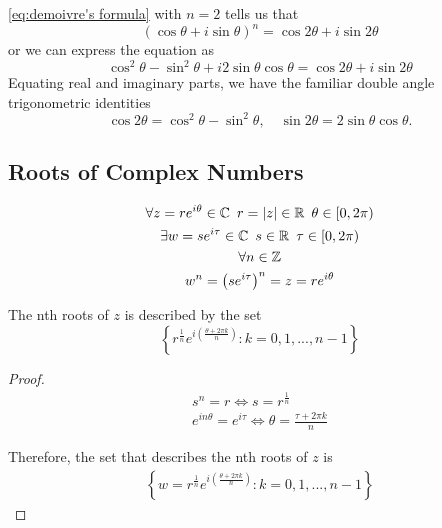 \documentclass[11pt, oneside]{book}
\begin{document}
\begin{eg}
	\cref{eq:demoivre's formula} with $n = 2$ tells us that
	\begin{equation*}
		(\cos \theta + i \sin \theta)^n = \cos 2\theta + i \sin 2\theta
	\end{equation*}
	or we can express the equation as
	\begin{equation*}
		\cos^2 \theta - \sin^2 \theta + i2 \sin\theta \cos\theta = \cos 2\theta + i \sin 2\theta
	\end{equation*}
	Equating real and imaginary parts, we have the familiar double angle trigonometric identities
	\begin{equation*}
		\cos 2\theta = \cos^2 \theta - \sin^2 \theta, \quad \sin 2\theta = 2\sin\theta\cos\theta.
	\end{equation*}
\end{eg}

\subsection{Roots of Complex Numbers} %
\label{sub:roots_of_complex_numbers}

\begin{propo}\label{propo:nth Roots of a Complex Number}
	\begin{gather*}
		\forall z = re^{i\theta} \in \mathbb{C} \enspace r = \left|z\right| \in \mathbb{R} \enspace \theta \in [0, 2\pi) \\
		\exists w = se^{i\tau} \in \mathbb{C} \enspace s \in \mathbb{R} \enspace \tau \in [0, 2\pi) \\
		\forall n \in \mathbb{Z} \\ 
		w^n = \left( se^{i\tau}\right)^n = z = re^{i\theta}
	\end{gather*}

	The nth roots of $z$ is described by the set
	\begin{equation}\label{eq:nth roots of a complex number}
		\left\{ r^{\frac{1}{n}} e^{i \left(\frac{\theta + 2 \pi k}{n} \right)} : k = 0, 1, ..., n - 1 \right\}
	\end{equation}

	\begin{proof}
		\begin{gather*}
			s^n = r \iff s = r^{\frac{1}{n}} \\
			e^{in\theta} = e^{i \tau} \iff \theta = \frac{\tau + 2 \pi k}{n}
		\end{gather*}

		Therefore, the set that describes the nth roots of $z$ is
		\begin{gather*}
			\left\{ w = r^\frac{1}{n} e^{i \left( \frac{\theta + 2 \pi k}{n} \right)} : k = 0, 1, ..., n - 1 \right\}
		\end{gather*}
	\end{proof}
\end{propo}
\end{document}
